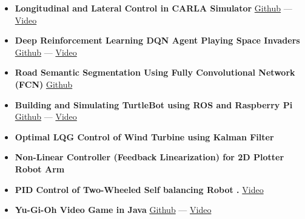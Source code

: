 \documentclass[10pt,a4paper,ragged2e]{altacv}
\begin{document}
\begin{itemize}
\item \textbf{Longitudinal and Lateral Control in CARLA Simulator}
\href{https://github.com/HemaZ/carla-longlat-control}{Github} --- \href{https://www.youtube.com/watch?v=_ONfGpo1h-4}{Video}

\item \textbf{Deep Reinforcement Learning DQN Agent Playing Space Invaders }
\href{https://github.com/HemaZ/Deep-Reinforcement-Learning}{Github} --- \href{https://www.youtube.com/watch?v=yR3SW-NdS-k&t=3s}{Video}

\item \textbf{Road Semantic Segmentation Using Fully Convolutional Network (FCN) }
\href{https://github.com/HemaZ/sem-seg}{Github}

\item \textbf{Building and Simulating TurtleBot using ROS and Raspberry Pi}
\href{https://github.com/HemaZ/AMR_ROS}{Github} --- \href{https://www.youtube.com/watch?v=ThAjbMSuvAo}{Video}
\item \textbf{Optimal LQG Control of Wind Turbine using
Kalman Filter}

\item \textbf{Non-Linear Controller (Feedback Linearization) for 2D Plotter Robot Arm}

\item \textbf{PID Control of Two-Wheeled Self balancing Robot .}
\href{https://www.youtube.com/watch?v=lp5exim_Jro}{Video}

\item \textbf{Yu-Gi-Oh Video Game in Java}
\href{https://github.com/HemaZ/yu-gi-oh-java}{Github} --- \href{https://www.youtube.com/watch?v=wY9EOFwh1F0}{Video}
\end{itemize}


\divider


\divider


\end{document}
